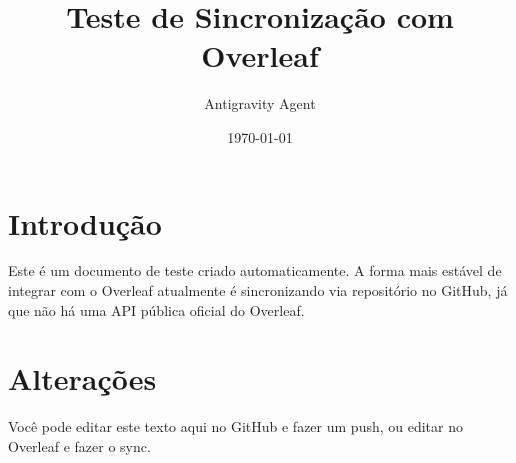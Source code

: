 \documentclass{article}
\title{Teste de Sincronização com Overleaf}
\author{Antigravity Agent}
\date{\today}
\begin{document}
\maketitle

\section{Introdução}
Este é um documento de teste criado automaticamente. 
A forma mais estável de integrar com o Overleaf atualmente é sincronizando via repositório no GitHub, já que não há uma API pública oficial do Overleaf.

\section{Alterações}
Você pode editar este texto aqui no GitHub e fazer um push, ou editar no Overleaf e fazer o sync.
\end{document}
